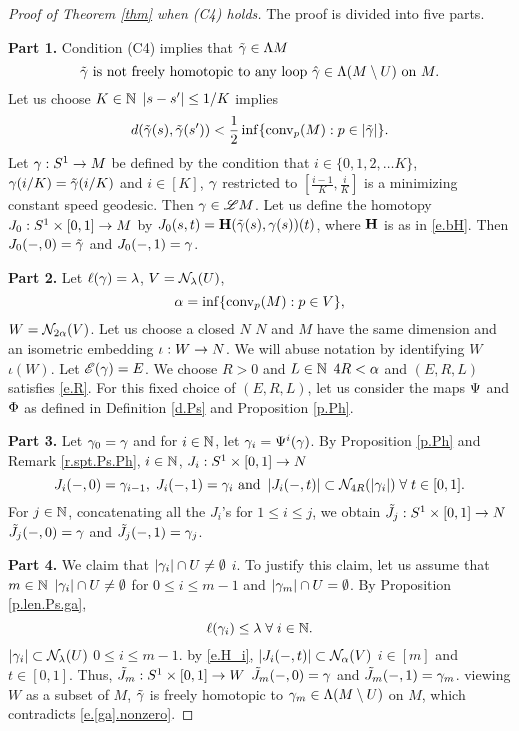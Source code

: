 \documentclass[11pt,twoside]{article}
\begin{document}
\begin{proof}[Proof of Theorem \ref{thm} when (C4) holds] The proof is divided into five parts.
	
	\noindent\textbf{Part 1.} Condition (C4) implies that \tes \(\tilde{\gamma}\in \Lambda M\) \st 
	\begin{equation}\label{e.[ga].nonzero}
	\tilde{\gamma} \text{ is not freely homotopic to any loop } \hat{\gamma} \in \Lambda (M\setminus U) \text{ on } M.
	\end{equation}
	Let us choose \(K\in \mathbb{N}\) \sot \(\left|s-s'\right|\leq 1/K\) implies
	\[d(\tilde{\gamma}(s),\tilde{\gamma}(s'))<\frac{1}{2}\inf\{\text{conv}_p(M):p\in \left|\tilde{\gamma}\right|\}.\]
	Let \(\gamma:S^1\rightarrow M\) be defined by the condition that \fa \(i\in \{0,1,2,\dots K\}\), \(\gamma(i/K)=\tilde{\gamma}(i/K)\) and \fa $i\in [K]$, \(\gamma\) restricted to \([\frac{i-1}{K},\frac{i}{K}]\) is a minimizing constant speed geodesic. Then $\gamma\in \mathscr{L} M$. Let us define the homotopy \(J_0:S^1\times [0,1]\rightarrow M\) by \(J_0(s,t)=\mathbf{H}(\tilde{\gamma}(s),\gamma(s))(t)\), where \(\mathbf{H}\) is as in \eqref{e.bH}. Then \(J_0(-,0)=\tilde{\gamma}\) and \(J_0(-,1)=\gamma\).
	
	\noindent\textbf{Part 2.} Let \(\ell(\gamma)=\lambda\), \(V=\mathcal{N}_{\lambda}(U)\),
	\[\alpha=\inf \{\text{conv}_p(M):p\in V \}, \]
	\(W=\mathcal{N}_{2\alpha}(V)\). Let us choose a closed \Rm \mf \(N\) \st \(N\) and \(M\) have the same dimension and \tes an isometric embedding \(\iota:W \rightarrow N\). We will abuse notation by identifying \(W\) \w \(\iota(W)\).  Let \(\mathscr{E}(\gamma)=E\). We choose \(R>0\) and \(L\in \mathbb{N}\) \sot \(4R<\alpha\) and \((E,R,L)\) satisfies \eqref{e.R}. For this fixed choice of \((E,R,L)\), let us consider the maps \(\Psi\) and \(\Phi\) as defined in Definition \ref{d.Ps} and Proposition \ref{p.Ph}.
	
	\noindent\textbf{Part 3.} Let $\gamma_0=\gamma$ and for \(i\in\mathbb{N}\), let \(\gamma_i=\Psi^i(\gamma)\). 
	By Proposition \ref{p.Ph} and Remark \ref{r.spt.Ps.Ph}, \fa \(i\in\mathbb{N}\), \tes \(J_i:S^1\times[0,1]\rightarrow N\) \st 
	\begin{equation}\label{e.H_i}
	J_i(-,0)=\gamma_{i-1},\; J_i(-,1)=\gamma_i\text{ and } \left|J_i(-,t)\right|\subset \mathcal{N}_{4R}(\left|\gamma_i\right|)\;\forall\;t\in[0,1].
	\end{equation}
	For \(j\in\mathbb{N}\), concatenating all the \(J_i\)'s for $1\leq i\leq j$, we obtain \(\tilde{J}_j:S^1\times [0,1]\rightarrow N\) \st \(\tilde{J}_j(-,0)=\gamma\) and \(\tilde{J}_j(-,1)=\gamma_j\). 
	
	\noindent\textbf{Part 4.} We claim that \(\left|\gamma_i\right|\cap U\neq \emptyset\) \fa \(i\). To justify this claim, let us assume that \tes \(m\in \mathbb{N}\) \st \(\left|\gamma_i\right|\cap U\neq \emptyset\) for \(0\leq i\leq m-1\) and \(\left|\gamma_m\right|\cap U=\emptyset\). By Proposition \ref{p.len.Ps.ga}, 
	\begin{equation}\label{e.ell.ga_i}
	\ell(\gamma_i)\leq \lambda\; \forall\;i\in\mathbb{N}.
	\end{equation} 
	\hn \(\left|\gamma_i\right|\subset \mathcal{N}_{\lambda}(U)\) \fa \(0\leq i\leq m-1.\) \tf by \eqref{e.H_i}, \(\left|J_i(-,t)\right|\subset \mathcal{N}_{\alpha}(V)\) \fa \(i\in[m]\) and $t\in [0,1]$. Thus, \(\tilde{J}_m:S^1\times [0,1]\rightarrow W\) \w \(\tilde{J}_m(-,0)=\gamma\) and \(\tilde{J}_m(-,1)=\gamma_m\). \tf viewing \(W\) as a subset of \(M\), $\tilde{\gamma}$ is freely homotopic to $\gamma_m\in \Lambda (M\setminus U)$ on $M$, which contradicts \eqref{e.[ga].nonzero}.
	

\end{proof}
\end{document}
